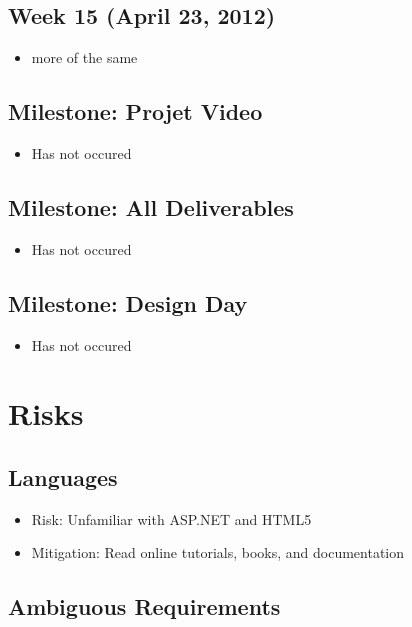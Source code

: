 \documentclass[11pt,a4paper,oneside]{article}
\begin{document}
\subsection{Week 15 (April 23, 2012)}
\begin{itemize}
\item more of the same
\end{itemize}

\subsection{Milestone: Projet Video}
\begin{itemize}
\item Has not occured
\end{itemize}

\subsection{Milestone: All Deliverables}
\begin{itemize}
\item Has not occured
\end{itemize}

\subsection{Milestone: Design Day}
\begin{itemize}
\item Has not occured
\end{itemize}




\section{Risks}

\subsection{Languages}

\begin{itemize}
\item Risk: Unfamiliar with ASP.NET and HTML5 
\item Mitigation: Read online tutorials, books, and documentation
\end{itemize}


\subsection{Ambiguous Requirements}
\end{document}
